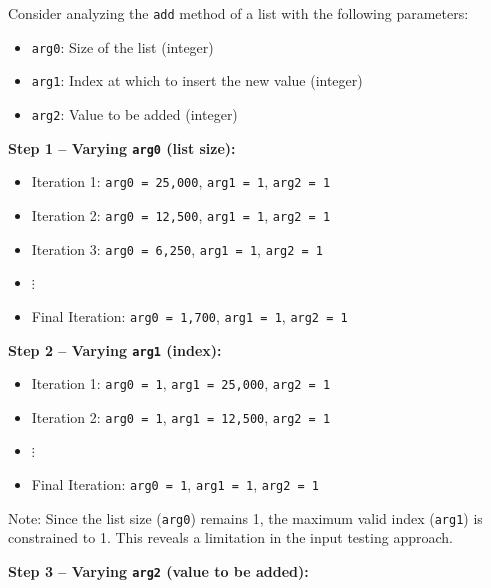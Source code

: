 \begin{tcolorbox}[
    title=Example: Input Testing Process for \texttt{List.add(index, Element)},
    colback=gray!5!white,
    colframe=gray!75!black,
    fonttitle=\bfseries,
    breakable,
    label={box:add-method-testing}
]

Consider analyzing the \texttt{add} method of a list with the following parameters:
\begin{itemize}
    \item \texttt{arg0}: Size of the list (integer)
    \item \texttt{arg1}: Index at which to insert the new value (integer)
    \item \texttt{arg2}: Value to be added (integer)
\end{itemize}

\textbf{Step 1 – Varying \texttt{arg0} (list size):}

\begin{itemize}
    \item Iteration 1: \texttt{arg0 = 25,000}, \texttt{arg1 = 1}, \texttt{arg2 = 1}
    \item Iteration 2: \texttt{arg0 = 12,500}, \texttt{arg1 = 1}, \texttt{arg2 = 1}
    \item Iteration 3: \texttt{arg0 = 6,250}, \texttt{arg1 = 1}, \texttt{arg2 = 1}
    \item $\vdots$
    \item Final Iteration: \texttt{arg0 = 1,700}, \texttt{arg1 = 1}, \texttt{arg2 = 1}
\end{itemize}

\textbf{Step 2 – Varying \texttt{arg1} (index):}

\begin{itemize}
    \item Iteration 1: \texttt{arg0 = 1}, \texttt{arg1 = 25,000}, \texttt{arg2 = 1}
    \item Iteration 2: \texttt{arg0 = 1}, \texttt{arg1 = 12,500}, \texttt{arg2 = 1}
    \item $\vdots$
    \item Final Iteration: \texttt{arg0 = 1}, \texttt{arg1 = 1}, \texttt{arg2 = 1}
\end{itemize}

{Note: Since the list size (\texttt{arg0}) remains 1, the maximum valid index (\texttt{arg1}) is constrained to 1. This reveals a limitation in the input testing approach.}

\textbf{Step 3 – Varying \texttt{arg2} (value to be added):}


\end{tcolorbox}
